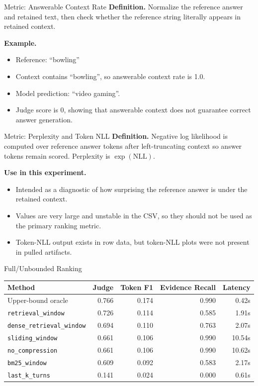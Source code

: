 \documentclass[aspectratio=169]{beamer}
\newcommand{\method}[1]{\texttt{#1}}
\newcommand{\metric}[1]{\textbf{#1}}
\begin{document}
\begin{frame}{Metric: Answerable Context Rate}
\metric{Definition.} Normalize the reference answer and retained text, then check whether the reference string literally appears in retained context.

\vspace{0.5em}
\metric{Example.}
\begin{itemize}
  \item Reference: ``bowling''
  \item Context contains ``bowling'', so answerable context rate is 1.0.
  \item Model prediction: ``video gaming''.
  \item Judge score is 0, showing that answerable context does not guarantee correct answer generation.
\end{itemize}
\end{frame}

\begin{frame}{Metric: Perplexity and Token NLL}
\metric{Definition.} Negative log likelihood is computed over reference answer tokens after left-truncating context so answer tokens remain scored. Perplexity is \(\exp(\mathrm{NLL})\).

\vspace{0.5em}
\metric{Use in this experiment.}
\begin{itemize}
  \item Intended as a diagnostic of how surprising the reference answer is under the retained context.
  \item Values are very large and unstable in the CSV, so they should not be used as the primary ranking metric.
  \item Token-NLL output exists in row data, but token-NLL plots were not present in pulled artifacts.
\end{itemize}
\end{frame}

\begin{frame}{Full/Unbounded Ranking}
\begin{tabular}{lrrrr}
\toprule
Method & Judge & Token F1 & Evidence Recall & Latency \\
\midrule
Upper-bound oracle & 0.766 & 0.174 & 0.990 & 0.42s \\
\method{retrieval\_window} & 0.726 & 0.114 & 0.585 & 1.91s \\
\method{dense\_retrieval\_window} & 0.694 & 0.110 & 0.763 & 2.07s \\
\method{sliding\_window} & 0.661 & 0.106 & 0.990 & 10.54s \\
\method{no\_compression} & 0.661 & 0.106 & 0.990 & 10.62s \\
\method{bm25\_window} & 0.609 & 0.092 & 0.583 & 2.17s \\
\method{last\_k\_turns} & 0.141 & 0.024 & 0.000 & 0.61s \\
\bottomrule
\end{tabular}
\end{frame}
\end{document}
